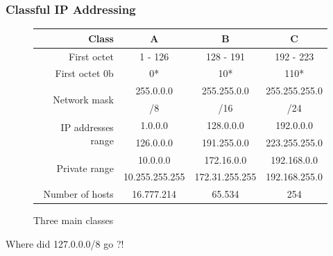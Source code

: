   \begin{frame}
    \frametitle{Classful IP Addressing}
    \begin{figure}
      \centering
      \resizebox{11.5cm}{!} {
	\begin{tabular}{|r||c|c|c|}
	  \hline
	  Class & A & B & C \\ \hline \hline
	  First octet & {\color{ForestGreen}1} - {\color{ForestGreen}126} & {\color{ForestGreen}128} - {\color{ForestGreen}191} & {\color{ForestGreen}192} - {\color{ForestGreen}223} \\ \hline
	  First octet 0b& {\color{ForestGreen}0*} & {\color{ForestGreen}10*} & {\color{ForestGreen}110*} \\ \hline
	  \multirow{2}{*}{\color{brown}Network mask} & {\color{brown}255}.{\color{fuchsia}0.0.0} & {\color{brown}255.255}.{\color{fuchsia}0.0} & {\color{brown}255.255.255}.{\color{fuchsia}0}\\
	  & {\color{brown}/8} & {\color{brown}/16} & {\color{brown}/24} \\ \hline
	  \multirow{2}{*}{IP addresses range} & {\color{ForestGreen}1}.{\color{blue}0.0.0} & {\color{ForestGreen}128.0}.{\color{blue}0.0} & {\color{ForestGreen}192.0.0}.{\color{blue}0}\\
	  & {\color{ForestGreen}126}.{\color{blue}0.0.0} & {\color{ForestGreen}191.255}.{\color{blue}0.0} & {\color{ForestGreen}223.255.255}.{\color{blue}0} \\ \hline
	  \multirow{2}{*}{Private range}
	  & {\color{ForestGreen}10}.{\color{blue}0.0.0} 	    & {\color{ForestGreen}172.16}.{\color{blue}0.0}     & {\color{ForestGreen}192.168.0}.{\color{blue}0}\\
	  & {\color{ForestGreen}10}.{\color{blue}255.255.255} & {\color{ForestGreen}172.31}.{\color{blue}255.255} & {\color{ForestGreen}192.168.255}.{\color{blue}0} \\ \hline
	  Number of {\color{blue}hosts} & 16.777.214 & 65.534 & 254 \\ \hline
	\end{tabular}
      }
      \caption{Three main classes}
    \end{figure}
    Where did {\color{ForestGreen}127}.{\color{blue}0.0.0}{\color{brown}/8} go ?!
  \end{frame}

